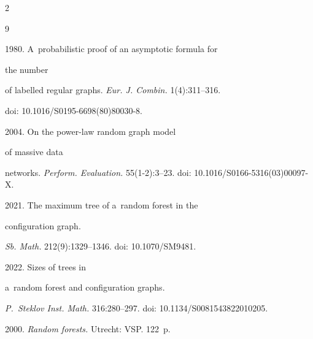 \begin{multicols}{2}
{{\begin{thebibliography}{9}


 1980. A~probabilistic proof of an asymptotic formula for 


the number


of labelled regular graphs. \textit{Eur. J. Combin.} 1(4):311--316. 


doi: 10.1016/S0195-6698(80)80030-8.







 2004. On the power-law random graph model 


of massive data


networks. \textit{Perform. Evaluation.} 55(1-2):3--23. doi: 10.1016/S0166-5316(03)00097-X.







 2021. The maximum tree of a~random forest in the 


configuration graph.


\textit{Sb. Math.} 212(9):1329--1346. doi: 10.1070/SM9481.







 2022. Sizes of trees in 


a~random forest and configuration graphs.


\textit{P.~Steklov Inst. Math.} 316:280--297. doi: 10.1134/S0081543822010205.







 2000. \textit{Random forests.} Utrecht: VSP. 122~p.


\end{thebibliography}





 }


 }





\end{multicols}





\vspace*{-6pt}





